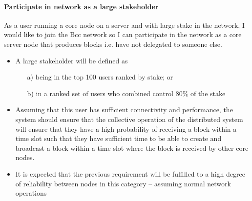 \paragraph{Participate in network as a large stakeholder}

As a user running a core node on a server and with large stake in the network,
I would like to join the Bcc network so I can participate in the network as
a core server node that produces blocks i.e. have not delegated to someone else.

\begin{itemize}
\item A large stakeholder will be defined as
      \begin{itemize}
      \item[a)] being in the top 100 users ranked by stake; or
      \item[b)] in a ranked set of users who combined control 80\% of the stake
      \end{itemize}
\item Assuming that this user has sufficient connectivity and performance, the
      system should ensure that the collective operation of the distributed
      system will ensure that they have a high probability of receiving a
      block within a time slot such that they have sufficient time to be able
      to create and broadcast a block within a time slot where the block is
      received by other core nodes.
\item It is expected that the previous requirement will be fulfilled to a high
      degree of reliability between nodes in this category -- assuming normal
      network operations


\end{itemize}
